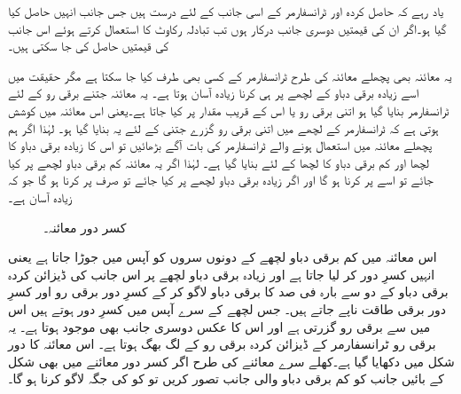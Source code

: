 یاد رہے کہ حاصل کردہ  اور  ٹرانسفارمر کے اسی جانب کے لئے درست ہیں جس جانب انہیں حاصل کیا گیا ہو۔اگر ان کی قیمتیں دوسری جانب درکار ہوں تب تبادلہ رکاوٹ کا استعمال کرتے ہوئے اس جانب کی قیمتیں حاصل کی جا سکتی ہیں۔ 

یہ معائنہ بھی پچھلے معائنہ کی طرح ٹرانسفارمر کے کسی بھی طرف کیا جا سکتا ہے مگر حقیقت میں اسے زیادہ برقی دباو کے لچھے پر ہی کرنا زیادہ آسان ہوتا ہے۔ یہ معائنہ جتنے برقی رو کے لئے ٹرانسفارمر بنایا گیا ہو اتنی برقی رو یا اس کے قریب مقدار پر کیا جاتا ہے۔یعنی اس معائنہ میں کوشش ہوتی ہے کہ ٹرانسفارمر کے لچھے میں اتنی برقی رو گزرے جتنی کے لئے یہ بنایا گیا ہو۔ لہٰذا اگر ہم پچھلے معائنہ میں استعمال ہونے والے ٹرانسفارمر کی بات آگے بڑھائیں تو اس کا زیادہ برقی دباو کا لچھا  اور کم برقی دباو کا لچھا  کے لئے بنایا گیا ہے۔ لہٰذا اگر یہ معائنہ کم برقی دباو لچھے پر کیا جائے تو اسے   پر  کرنا ہو گا اور اگر زیادہ برقی دباو لچھے پر کیا جائے تو صرف  پر کرنا ہو گا جو کہ زیادہ آسان ہے۔
\begin{figure}
\centering
\caption{کسر دور معائنہ۔}
\label{شکل_ٹرانسفارمر_کسر_دور_معائنہ}
\end{figure}

اس معائنہ میں کم برقی دباو لچھے کے دونوں سروں کو آپس میں جوڑا جاتا ہے یعنی انہیں کسرِ دور کر لیا جاتا ہے اور زیادہ برقی دباو لچھے پر اس جانب کی ڈیزائن کردہ برقی دباو کے دو سے بارہ  فی صد کا برقی دباو  لاگو کر کے کسرِ دور برقی رو  اور کسرِ دور برقی طاقت  ناپے جاتے ہیں۔ جس لچھے کے سرے آپس میں کسرِ دور ہوتے ہیں اس میں سے برقی رو گزرتی ہے اور اس کا عکس دوسری جانب بھی موجود ہوتا ہے۔ یہ برقی رو ٹرانسفارمر کے ڈیزائن کردہ برقی رو کے لگ بھگ ہوتا ہے۔ اس معائنہ کا دور شکل  میں دکھایا گیا ہے۔کھلے سرے معائنے کی طرح اگر کسر دور معائنے میں بھی  شکل  کے بائیں جانب کو کم برقی دباو والی جانب تصور کریں تو   کو   کی جگہ لاگو کرنا ہو گا۔

